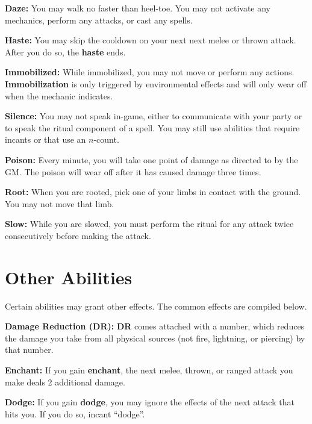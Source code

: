 \documentclass[green]{grimrock}
\begin{document}
{\bf Daze:} You may walk no faster than heel-toe.  You may not activate any mechanics, perform any attacks, or cast any spells.


{\bf Haste:} You may skip the cooldown on your next next melee or thrown attack.  After you do so, the {\bf haste} ends.

{\bf Immobilized:}  While immobilized, you may not move or perform any actions.  {\bf Immobilization} is only triggered by environmental effects and will only wear off when the mechanic indicates.

{\bf Silence:} You may not speak in-game, either to communicate with your party or to speak the ritual component of a spell.  You may still use abilities that require incants or that use an $n$-count.

{\bf Poison:}  Every minute, you will take one point of damage as directed to by the GM.  The poison will wear off after it has caused damage three times.

{\bf Root:} When you are rooted, pick one of your  limbs in contact with the ground.  You may not move that limb.

{\bf Slow:} While you are slowed, you must perform the ritual for any attack twice consecutively before making the attack.

\section{Other Abilities}

Certain abilities may grant other effects.  The common effects are compiled below.

{\bf Damage Reduction (DR):} {\bf DR} comes attached with a number, which reduces the damage you take from all physical sources (not fire, lightning, or piercing) by that number.

{\bf Enchant:} If you gain {\bf enchant}, the next melee, thrown, or ranged attack you make deals 2 additional damage.

{\bf Dodge:} If you gain {\bf dodge}, you may ignore the effects of the next attack that hits you.  If you do so, incant ``dodge''.



\end{document}
